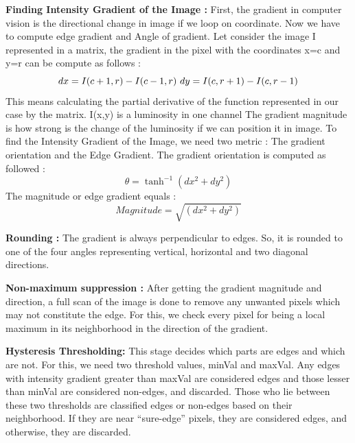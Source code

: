 \documentclass[a4paper]{article}
\begin{document}
\begin{itemize}
\item{\textbf{Finding Intensity Gradient of the Image \cite{gradient}: } 
	First, the gradient in computer vision is the directional change in image if we loop on coordinate. Now we have to compute edge gradient and Angle of gradient.
    Let consider the image I represented in a matrix, the gradient in the pixel with the coordinates x=c and y=r can be compute as follows :
    \begin{equation}
    dx = I(c+1, r) - I(c-1,r) \\\
    dy = I(c,r+1) - I(c,r-1) 
    \end{equation}
    This means calculating the partial derivative of the function represented in our case by the matrix.
    I(x,y) is a luminosity in one channel 
    The gradient magnitude is how strong is the change of the luminosity if we can position it in image.
	To find the Intensity Gradient of the Image, we need two metric :
	The gradient orientation and the Edge Gradient.
	The gradient orientation is computed as followed :
	\begin{equation} 
	\theta = \tanh^{-1}{(dx^2 + dy^2)}
	\end{equation}
	The magnitude or edge gradient  equals :
	\begin{equation} 
	Magnitude = \sqrt{(dx^2 + dy^2)}
	\end{equation}
}

\item{\textbf{Rounding : } The gradient is always perpendicular to edges. So, it is rounded to one of the four angles representing vertical, horizontal and two diagonal directions.

\item {\textbf{Non-maximum suppression : } After getting the gradient magnitude and direction, a full scan of the image is done to remove any unwanted pixels which may not constitute the edge. For this, we check every pixel for being a local maximum in its neighborhood in the direction of the gradient.
}

\item{\textbf{Hysteresis Thresholding:} This stage decides which parts are edges and which are not. For this, we need two threshold values, minVal and maxVal. Any edges with intensity gradient greater than maxVal are considered edges and those lesser than minVal are considered non-edges, and discarded. Those who lie between these two thresholds are classified edges or non-edges based on their neighborhood. If they are near “sure-edge” pixels, they are considered edges, and otherwise, they are discarded.
}



}
\end{itemize}
\end{document}

